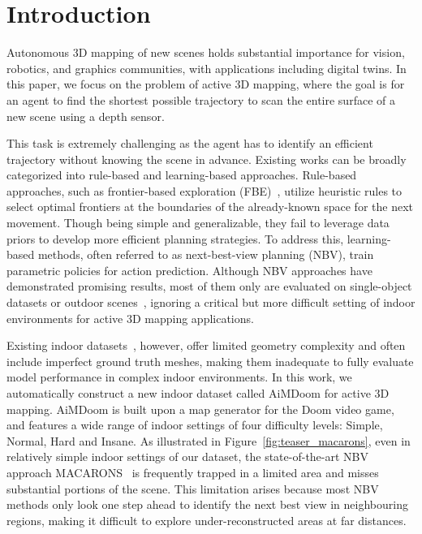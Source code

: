 \section{Introduction}

Autonomous 3D mapping of new scenes holds substantial importance for vision, robotics, and graphics communities, with applications including digital twins. 
In this paper, we focus on the problem of active 3D mapping, where the goal is for an agent to find the shortest possible trajectory to scan the entire surface of a new scene using a depth sensor. 

This task is extremely challenging as the agent has to identify an efficient trajectory without knowing the scene in advance. 
Existing works can be broadly categorized into rule-based and learning-based approaches. 
Rule-based approaches, such as frontier-based exploration (FBE)~\citep{fbe}, utilize heuristic rules to select optimal frontiers at the boundaries of the already-known space for the next movement.
Though being simple and generalizable, they fail to leverage data priors to develop more efficient planning strategies.
To address this, learning-based methods, often referred to as next-best-view planning (NBV), train parametric policies for action prediction.
Although NBV approaches have demonstrated promising results, most of them only are evaluated on single-object datasets or outdoor scenes~\citep{guedon2022scone, chang2015shapenet, rlnbv}, ignoring a critical but more difficult setting of indoor environments for active 3D mapping applications.

Existing indoor datasets~\citep{gibson,Matterport3D}, however, offer limited geometry complexity and often include imperfect ground truth meshes, making them inadequate to fully evaluate model performance in complex indoor environments.
In this work, we automatically construct a new indoor dataset called AiMDoom for active 3D mapping. AiMDoom is built upon a map generator for the Doom video game, and features a wide range of indoor settings of four difficulty levels: Simple, Normal, Hard and Insane.
As illustrated in Figure~\ref{fig:teaser_macarons}, even in relatively simple indoor settings of our dataset, the state-of-the-art NBV approach MACARONS~\citep{guedon2023macarons} is frequently trapped in a limited area and misses substantial portions of the scene.
This limitation arises because most NBV methods only look one step ahead to identify the next best view in neighbouring regions, making it difficult to explore under-reconstructed areas at far distances.

